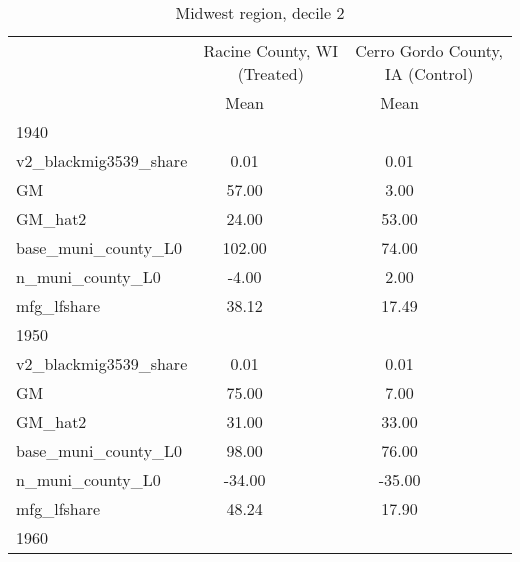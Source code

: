 \begin{table}[htbp]\centering
\def\sym#1{\ifmmode^{#1}\else\(^{#1}\)\fi}
\caption{Midwest region, decile 2 \label{tab1}}
\begin{tabular}{l*{2}{ccc}}
\toprule
                    &\multicolumn{3}{c}{Racine County, WI (Treated)}&\multicolumn{3}{c}{Cerro Gordo County, IA (Control)}\\
                    &        Mean&            &            &        Mean&            &            \\
\midrule
1940                &            &            &            &            &            &            \\
v2\_blackmig3539\_share&        0.01&            &            &        0.01&            &            \\
GM                  &       57.00&            &            &        3.00&            &            \\
GM\_hat2             &       24.00&            &            &       53.00&            &            \\
base\_muni\_county\_L0 &      102.00&            &            &       74.00&            &            \\
n\_muni\_county\_L0    &       -4.00&            &            &        2.00&            &            \\
mfg\_lfshare         &       38.12&            &            &       17.49&            &            \\
\midrule
1950                &            &            &            &            &            &            \\
v2\_blackmig3539\_share&        0.01&            &            &        0.01&            &            \\
GM                  &       75.00&            &            &        7.00&            &            \\
GM\_hat2             &       31.00&            &            &       33.00&            &            \\
base\_muni\_county\_L0 &       98.00&            &            &       76.00&            &            \\
n\_muni\_county\_L0    &      -34.00&            &            &      -35.00&            &            \\
mfg\_lfshare         &       48.24&            &            &       17.90&            &            \\
\midrule
1960                &            &            &            &            &            &            \\

\end{tabular}
\end{table}

